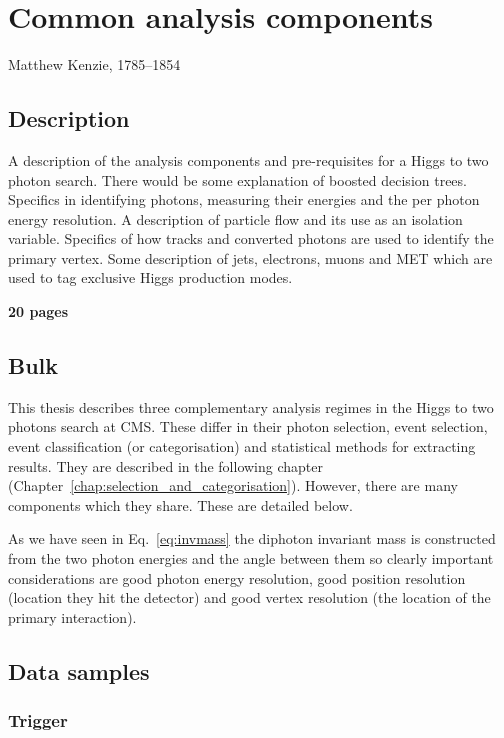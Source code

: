 \chapter{Common analysis components}
\label{chap:common_analysis_components}
{Matthew Kenzie, 1785--1854}

\section{Description}

A description of the analysis components and pre-requisites for a Higgs to two photon search. There would be some explanation of boosted decision trees. Specifics in identifying photons, measuring their energies and the per photon energy resolution. A description of particle flow and its use as an isolation variable. Specifics of how tracks and converted photons are used to identify the primary vertex. Some description of jets, electrons, muons and MET which are used to tag exclusive Higgs production modes.

\textbf{20 pages}

\section{Bulk}

This thesis describes three complementary analysis regimes in the Higgs to two photons search at CMS. These differ in their photon selection, event selection, event classification (or categorisation) and statistical methods for extracting results. They are described in the following chapter (Chapter~\ref{chap:selection_and_categorisation}). However, there are many components which they share. These are detailed below.

As we have seen in Eq.~\ref{eq:invmass} the diphoton invariant mass is constructed from the two photon energies and the angle between them so clearly important considerations are good photon energy resolution, good position resolution (location they hit the detector) and good vertex resolution (the location of the primary interaction).


\section{Data samples}
\subsection{Trigger}
